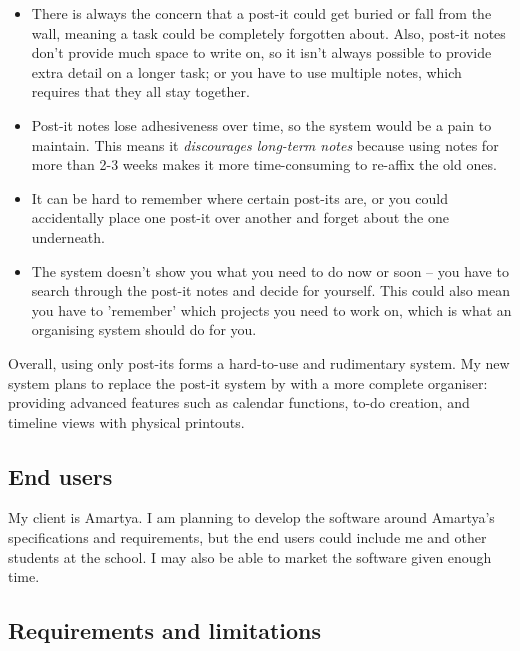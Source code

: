 \begin{itemize}
  \item There is always the concern that a post-it could get buried or fall
        from the wall, meaning a task could be completely forgotten about.
        Also, post-it notes don't provide much space to write on, so it isn't
        always possible to provide extra detail on a longer task; or you have to
        use multiple notes, which requires that they all stay together.
  \item Post-it notes lose adhesiveness over time, so the system would be a pain
        to maintain. This means it \textit{discourages long-term notes} because
        using notes for more than 2-3 weeks makes it more time-consuming to
        re-affix the old ones.
  \item It can be hard to remember where certain post-its are, or you could
        accidentally place one post-it over another and forget about the one
        underneath.
  \item The system doesn't show you what you need to do now or soon -- you have
        to search through the post-it notes and decide for yourself. This could
        also mean you have to 'remember' which projects you need to work on,
        which is what an organising system should do for you.
\end{itemize}

Overall, using only post-its forms a hard-to-use and rudimentary system. My new
system plans to replace the post-it system by with a more complete organiser:
providing advanced features such as calendar functions, to-do creation, and
timeline views with physical printouts.


\subsection{End users}

My client is Amartya. I am planning to develop the software around Amartya's
specifications and requirements, but the end users could include me and other
students at the school. I may also be able to market the software given enough
time.


\subsection{Requirements and limitations}

